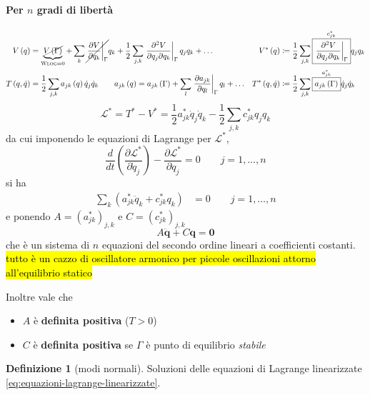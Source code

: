 \documentclass[a4paper,10pt]{article}
\theoremstyle{definition}
\newcommand{\noun}[1]{\textsc{#1}}
\newcommand{\bv}{\boldsymbol} %
\theoremstyle{indentdefinition}
\newtheorem{defn}{Definizione}[section]
\theoremstyle{indenttheorem}
\theoremstyle{myremark}
\theoremstyle{indentgeneral}
\begin{document}
\paragraph{Per $n$ gradi di libertà}
\begin{align*}
V\left(q\right) & =\underbrace{\cancel{V\left(\Gamma\right)}}_{\text{\noun{Wlog}}=0}+\sum_{k}\cancel{\left.\frac{\partial V}{\partial q_{k}}\right|_{\Gamma}}q_{k}+\frac{1}{2}\sum_{j,k}\left.\frac{\partial^{2}V}{\partial q_{j}\partial q_{k}}\right|_{\Gamma}q_{j}q_{k}+\dots & V^{*}\left(q\right) & \coloneqq\frac{1}{2}\sum_{j,k}\overset{c_{jk}^{*}}{\boxed{\left.\frac{\partial^{2}V}{\partial q_{j}\partial q_{k}}\right|_{\Gamma}}}q_{j}q_{k}\\
T\left(q,\dot{q}\right) & =\frac{1}{2}\sum_{j,k}a_{jk}\left(q\right)\dot{q}_{j}\dot{q}_{k}\qquad a_{jk}\left(q\right)=a_{jk}\left(\Gamma\right)+\sum_{l}\left.\frac{\partial a_{jk}}{\partial q_{l}}\right|_{\Gamma}q_{l}+\dots & T^{*}\left(q,\dot{q}\right) & \coloneqq\frac{1}{2}\sum_{j,k}\overset{a_{jk}^{*}}{\boxed{a_{jk}\left(\Gamma\right)}}\dot{q}_{j}\dot{q}_{k}
\end{align*}
\[
\mathcal{L}^{*}=T^{*}-V^{*}=\frac{1}{2}a_{jk}^*\dot{q}_j\dot{q}_k-\frac{1}{2}\sum_{j,k}c_{jk}^{*}q_{j}q_{k}
\]
da cui imponendo le equazioni di Lagrange per $\mathcal{L}^{*}$,
$$\frac{d}{dt}\left(\frac{\partial\mathcal{L}^{*}}{\partial\dot{q}_{j}}\right)-\frac{\partial\mathcal{L}^{*}}{\partial q_{j}}=0\qquad j=1,\dots,n$$
si ha
\begin{align}
\sum_{k}\left(a_{jk}^{*}\ddot{q}_{k}+c_{jk}^{*}q_{k}\right) & =0\qquad j=1,\dots,n \label{eq:equazioni-lagrange-linearizzate}
\end{align}
e ponendo $A=\left(a_{jk}^{*}\right)_{j,k}$ e $C=\left(c_{jk}^{*}\right)_{j,k}$
$$\boxed{A\ddot{\bv{q}}+C\bv{q}  =\boldsymbol{0}}$$
che è un sistema di $n$ equazioni del secondo ordine lineari a coefficienti costanti. \hl{tutto è un cazzo di oscillatore armonico per piccole oscillazioni attorno all'equilibrio statico}

Inoltre vale che 
\begin{itemize}
    \item $A$ è \textbf{definita positiva} ($T>0$)
   \item $C$ è \textbf{definita positiva} se $\Gamma$
è punto di equilibrio \emph{stabile}
\end{itemize} 
\begin{defn}[modi normali]
\label{def:modi-normali}Soluzioni delle equazioni di Lagrange linearizzate
\eqref{eq:equazioni-lagrange-linearizzate}.
\end{defn}
\end{document}
